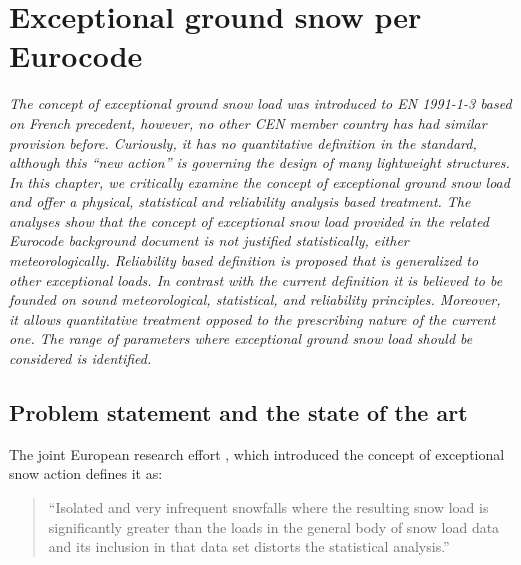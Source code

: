\chapter{Exceptional ground snow per Eurocode}
\label{cha:exceptional}

\ifpdf
    \graphicspath{{Chapter6/Figs/Raster/}{Chapter6/Figs/PDF/}{Chapter6/Figs/}}
\else
    \graphicspath{{Chapter6/Figs/Vector/}{Chapter6/Figs/}}
\fi

\leftskip=1cm
\noindent
\emph{The concept of exceptional ground snow load was introduced to EN 1991-1-3 based on French precedent, however, no other CEN member country has had similar provision before. Curiously, it has no quantitative definition in the standard, although this ``new action'' is governing the design of many lightweight structures. In this chapter, we critically examine the concept of exceptional ground snow load and offer a physical, statistical and reliability analysis based treatment. The analyses show that the concept of exceptional snow load provided in the related Eurocode background document is not justified statistically, either meteorologically. Reliability based definition is proposed that is generalized to other exceptional loads.  In contrast with the current definition it is believed to be founded on sound meteorological, statistical, and reliability principles. Moreover, it allows quantitative treatment opposed to the prescribing nature of the current one. The range of parameters where exceptional ground snow load should be considered is identified.}

\leftskip=0pt\rightskip=0pt

\section{Problem statement and the state of the art}

The joint European research effort \citep{Sanpaolesi1998}, which introduced the concept of exceptional snow action defines it as:
\begin{quote}
	``Isolated and very infrequent snowfalls where the resulting snow load is significantly greater than the loads in the general body of snow load data and its inclusion in that data set distorts the statistical analysis.''
\end{quote}
  
